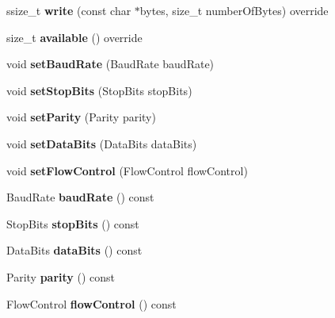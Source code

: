 \begin{DoxyCompactItemize}
ssize\+\_\+t {\bfseries write} (const char $\ast$bytes, size\+\_\+t number\+Of\+Bytes) override
\item 
\mbox{\label{class_cpp_serial_port_1_1_serial_port_a1d7dcc29d1119cd653702056522e5896}} 
size\+\_\+t {\bfseries available} () override
\item 
\mbox{\label{class_cpp_serial_port_1_1_serial_port_a476ac7cf164b4e5032e678e40fe55fed}} 
void {\bfseries set\+Baud\+Rate} (Baud\+Rate baud\+Rate)
\item 
\mbox{\label{class_cpp_serial_port_1_1_serial_port_a85e821679d098c7a245ddefd7afe8794}} 
void {\bfseries set\+Stop\+Bits} (Stop\+Bits stop\+Bits)
\item 
\mbox{\label{class_cpp_serial_port_1_1_serial_port_acd40e1ddd34b2355aa1f44a199b76ee1}} 
void {\bfseries set\+Parity} (Parity parity)
\item 
\mbox{\label{class_cpp_serial_port_1_1_serial_port_af827625d50ff19658cd1ef4cd6ceadf4}} 
void {\bfseries set\+Data\+Bits} (Data\+Bits data\+Bits)
\item 
\mbox{\label{class_cpp_serial_port_1_1_serial_port_afc245ca341189ccce0635a23d55ca62d}} 
void {\bfseries set\+Flow\+Control} (Flow\+Control flow\+Control)
\item 
\mbox{\label{class_cpp_serial_port_1_1_serial_port_abd4697780fd17ce3e6db0f7b8fb8aaab}} 
Baud\+Rate {\bfseries baud\+Rate} () const
\item 
\mbox{\label{class_cpp_serial_port_1_1_serial_port_aa8d6f6636e1d2979c63f31a537cc8d74}} 
Stop\+Bits {\bfseries stop\+Bits} () const
\item 
\mbox{\label{class_cpp_serial_port_1_1_serial_port_ac43fb422fb778e9a6f79af1ab8e060db}} 
Data\+Bits {\bfseries data\+Bits} () const
\item 
\mbox{\label{class_cpp_serial_port_1_1_serial_port_ab2dbea9d01bc345b835b3552c29acace}} 
Parity {\bfseries parity} () const
\item 
\mbox{\label{class_cpp_serial_port_1_1_serial_port_a5ccf8c9d17e3ac4697b2ff01082e718d}} 
Flow\+Control {\bfseries flow\+Control} () const
\end{DoxyCompactItemize}
